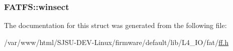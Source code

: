\subsubsection[{\texorpdfstring{winsect}{winsect}}]{ F\+A\+T\+F\+S\+::winsect}\hypertarget{structFATFS_ac60e69c00e6bf7c25febfbac4dc1476b}{}\label{structFATFS_ac60e69c00e6bf7c25febfbac4dc1476b}


The documentation for this struct was generated from the following file\+:\begin{DoxyCompactItemize}
\item 
/var/www/html/\+S\+J\+S\+U-\/\+D\+E\+V-\/\+Linux/firmware/default/lib/\+L4\+\_\+\+I\+O/fat/\hyperlink{ff_8h}{ff.\+h}\end{DoxyCompactItemize}

